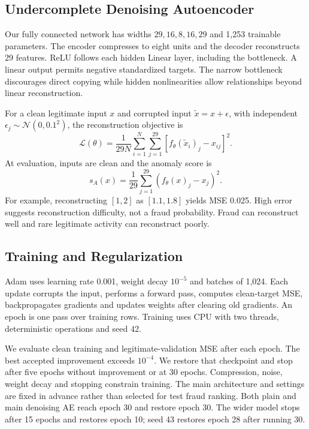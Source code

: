 \documentclass[conference]{IEEEtran}
\begin{document}
\subsection{Undercomplete Denoising Autoencoder}
Our fully connected network has widths $29,16,8,16,29$ and 1,253 trainable parameters. The encoder compresses to eight units and the decoder reconstructs 29 features. ReLU follows each hidden Linear layer, including the bottleneck. A linear output permits negative standardized targets. The narrow bottleneck discourages direct copying while hidden nonlinearities allow relationships beyond linear reconstruction.

For a clean legitimate input $x$ and corrupted input $\widetilde{x}=x+\epsilon$, with independent $\epsilon_j\sim\mathcal{N}(0,0.1^2)$, the reconstruction objective is
\begin{equation}
\mathcal{L}(\theta)=\frac{1}{29N}\sum_{i=1}^{N}\sum_{j=1}^{29}\left[f_\theta(\widetilde{x}_i)_j-x_{ij}\right]^2.
\end{equation}
At evaluation, inputs are clean and the anomaly score is
\begin{equation}
s_A(x)=\frac{1}{29}\sum_{j=1}^{29}(f_\theta(x)_j-x_j)^2.
\end{equation}
For example, reconstructing $[1,2]$ as $[1.1,1.8]$ yields MSE 0.025. High error suggests reconstruction difficulty, not a fraud probability. Fraud can reconstruct well and rare legitimate activity can reconstruct poorly.

\subsection{Training and Regularization}
Adam uses learning rate 0.001, weight decay $10^{-5}$ and batches of 1,024. Each update corrupts the input, performs a forward pass, computes clean-target MSE, backpropagates gradients and updates weights after clearing old gradients. An epoch is one pass over training rows. Training uses CPU with two threads, deterministic operations and seed 42.

We evaluate clean training and legitimate-validation MSE after each epoch. The best accepted improvement exceeds $10^{-4}$. We restore that checkpoint and stop after five epochs without improvement or at 30 epochs. Compression, noise, weight decay and stopping constrain training. The main architecture and settings are fixed in advance rather than selected for test fraud ranking. Both plain and main denoising AE reach epoch 30 and restore epoch 30. The wider model stops after 15 epochs and restores epoch 10; seed 43 restores epoch 28 after running 30.
\end{document}
